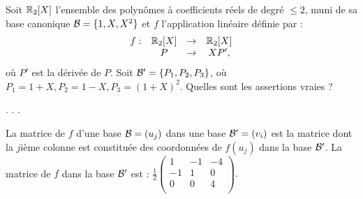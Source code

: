 \begin{question}
Soit $\mathbb{R}_2[X]$ l'ensemble des polynômes à coefficients réels de degré $\le 2$, muni de sa base canonique ${\cal {B}} = \{1,X,X^2\}$ et $f$ l'application linéaire définie par : 
$$\begin{array}{rccc}f:&\mathbb{R}_2[X] &\to& \mathbb{R}_2[X]\\
& P&\to &XP', \end{array}$$
où $P'$ est la dérivée de $P$. Soit ${\cal {B'}} = \{P_1,P_2,P_3\}$, où $P_1=1+X, P_2=1-X, P_3=(1+X)^2$. Quelles sont les assertions vraies ?
\begin{answers}  
.
.
.
\end{answers}
\vskip2mm
\begin{explanations} La matrice de $f$ d'une base ${\cal {B}}=(u_j)$ dans une  base $ {\cal {B}}'=(v_i)$ est la matrice  dont la $j$ième colonne est constituée des coordonnées de  $f(u_j)$ dans la base $ {\cal {B}}'$. La matrice de $f$ dans la base $ {\cal {B'}}$ est : $
\frac{1}{2}\left(\begin{array}{rcc}
1&-1&-4\\
-1&1&0\\ 
0&0&4\\
\end{array}\right).$
\end{explanations}
\end{question}

